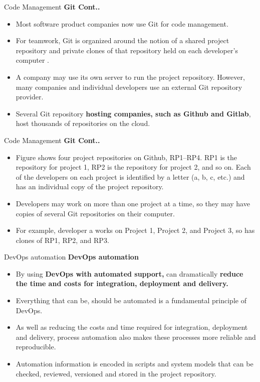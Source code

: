 \documentclass{beamer}
\begin{document}
\begin{frame}{Code Management}
\textbf{Git Cont..}
\begin{itemize}
	\item Most software product companies now use Git for code management.
	\item For teamwork, Git is organized around the notion of a shared project repository and private 
	clones of that repository held on each developer’s computer .
	\item A company may use its own server to run the project repository. However, many 
	companies and individual developers use an external Git repository provider. 
	\item Several Git repository \textbf{hosting companies, such as Github and Gitlab}, host thousands of 
		repositories on the cloud. 
\end{itemize}

\end{frame}
\begin{frame}{Code Management}
	\textbf{Git Cont..}
\begin{itemize}
	\item Figure  shows four project repositories on Github, RP1–RP4. RP1 is the repository for project 1, 
	 RP2 is the repository for project 2, and so on. Each of the developers on each project is identified 
	by a letter (a, b, c, etc.) and has an individual copy of the project repository. 
	\item Developers may work on more than one project at a time, so they may have copies of several Git 
	repositories on their computer.
	\item For example, developer a works on Project 1, Project 2, and Project 3, so has clones of RP1, RP2, 
	and RP3.
\end{itemize}
\end{frame}
\begin{frame}{DevOps automation}
\textbf{DevOps automation}
\begin{itemize}
	\item By using \textbf{DevOps with automated support,} can dramatically \textbf{reduce the time and costs for integration, deployment and delivery.}
	\item Everything that can be, should be automated is a fundamental principle of DevOps. 
	\item As well as reducing the costs and time required for integration, deployment and delivery, process automation also makes these processes more reliable and reproducible. 
	\item Automation information is encoded in scripts and system models that can be checked, reviewed, versioned and stored in the project repository.
\end{itemize}
\end{frame}
\end{document}

